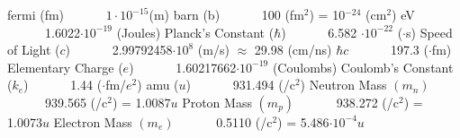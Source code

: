 \noindent
fermi (fm)  \hspace{10pt} \dotfill \ \ \ \ \ \ $1\cdot 10^{-15}$(m) \newline 
barn (b)  \hspace{10pt} \dotfill \ \ \ \ \ \ 100 (fm$^2$) = 10$^{-24}$ (cm$^2$) \newline
eV  \hspace{10pt} \dotfill \ \ \ \ \ \ 1.6022$\cdot 10^{-19}$ (Joules) \newline 
Planck's Constant ($\hbar$)  \hspace{10pt} \dotfill \ \ \ \ \ \ 6.582 $\cdot 10^{-22}$ (\mega\electronvolt$\cdot$s) \newline
Speed of Light ($c$)  \hspace{10pt} \dotfill \ \ \ \ \ \ 2.99792458$\cdot 10^{8}$ (m/s) $\approx$ 29.98 (cm/ns) \newline
$\hbar c$   \hspace{10pt} \dotfill \ \ \ \ \ \ 197.3 (\mega\electronvolt$\cdot$fm) \newline
Elementary Charge ($e$)  \hspace{10pt} \dotfill \ \ \ \ \ \ 1.60217662$\cdot 10^{-19}$ (Coulombs) \newline
Coulomb's Constant ($k_e$)  \hspace{10pt} \dotfill \ \ \ \ \ \ 1.44 (\mega\electronvolt$\cdot$fm/$e^2$) \newline
amu ($u$) \hspace{10pt} \dotfill \ \ \ \ \ \ 931.494 (\mega\electronvolt/c$^2$) \newline
Neutron Mass $(m_n)$ \hspace{10pt} \dotfill \ \ \ \ \ \ 939.565 (\mega\electronvolt/c$^2$) = 1.0087$u$ \newline
Proton Mass $(m_p)$ \hspace{10pt} \dotfill \ \ \ \ \ \ 938.272 (\mega\electronvolt/c$^2$) = 1.0073$u$ \newline
Electron Mass $(m_e)$  \hspace{10pt} \dotfill \ \ \ \ \ \ 0.5110 (\mega\electronvolt/c$^2$) = 5.486$\cdot 10^{-4}u$\newline
